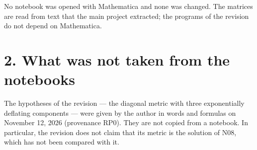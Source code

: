 \documentclass[
  10pt,
]{article}
\begin{document}
No notebook was opened with Mathematica and none was changed. The
matrices are read from text that the main project extracted; the
programs of the revision do not depend on Mathematica.

\hypertarget{what-was-not-taken-from-the-notebooks}{%
\section{2. What was not taken from the
notebooks}\label{what-was-not-taken-from-the-notebooks}}

The hypotheses of the revision --- the diagonal metric with three
exponentially deflating components --- were given by the author in words
and formulas on November 12, 2026 (provenance RP0). They are not copied
from a notebook. In particular, the revision does not claim that its
metric is the solution of N08, which has not been compared with it.
\end{document}
